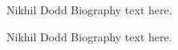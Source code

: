 \documentclass[12pt,journal,compsoc]{IEEEtran}
\begin{document}
 


\begin{IEEEbiographynophoto}{Nikhil Dodd}
Biography text here.
\end{IEEEbiographynophoto}


\begin{IEEEbiographynophoto}{Nikhil Dodd}
Biography text here.
\end{IEEEbiographynophoto}



\end{document}

